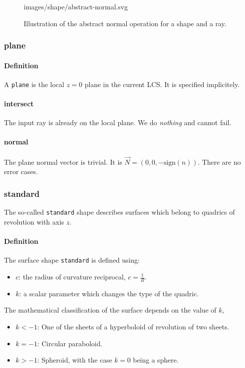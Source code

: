 \begin{figure} \caption{\label{fig:abstract-normal} Illustration of the
abstract normal operation for a shape and a ray.}

           {images/shape/abstract-normal.svg}
\end{figure}

\subsubsection{plane}
\paragraph{Definition}
A \lstinline{plane} is the local $z=0$ plane in the current \gls{LCS}.
It is specified implicitely.

\paragraph{intersect}
The input ray is already on the local plane. We do \emph{nothing} and cannot
fail.

\paragraph{normal}
The plane normal vector is trivial.
It is $\overrightarrow{N} = (0, 0, -\textrm{sign}(n))$.
There are no error cases.

\subsubsection{standard}
The so-called \lstinline{standard} shape describes surfaces which
belong to quadrics of revolution with axis $z$.

\paragraph{Definition}
The surface shape \lstinline{standard} is defined using:
\begin{itemize}
\item $c$: the radius of curvature reciprocal, $c = \frac{1}{R}$.
\item $k$: a scalar parameter which changes the type of the quadric.
\end{itemize}

The mathematical classification of the surface depends on the value of
$k$,

\begin{itemize}
\item $k < -1$: One of the sheets of a hyperboloid of revolution of two sheets.
\item $k = -1$: Circular paraboloid.
\item $k > -1$: Spheroid, with the case $k=0$ being a sphere.
\end{itemize}

